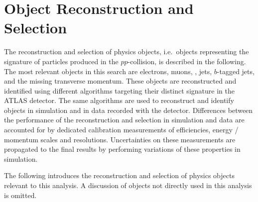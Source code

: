 \section{Object Reconstruction and Selection}
\label{sec:object_reconstruction}

The reconstruction and selection of physics objects, i.e.\ objects representing
the signature of particles produced in the $pp$-collision, is described in the
following. The most relevant objects in this search are electrons, muons,
\tauhadvis, jets, $b$-tagged jets, and the missing transverse momentum. These
objects are reconstructed and identified using different algorithms targeting
their distinct signature in the ATLAS detector. The same algorithms are used to
reconstruct and identify objects in simulation and in data recorded with the
detector.  Differences between the performance of the reconstruction and
selection in simulation and data are accounted for by dedicated calibration
measurements of efficiencies, energy / momentum scales and
resolutions. Uncertainties on these measurements are propagated to the final
results by performing variations of these properties in simulation.

The following introduces the reconstruction and selection of physics objects
relevant to this analysis. A discussion of objects not directly used in this
analysis is omitted.

